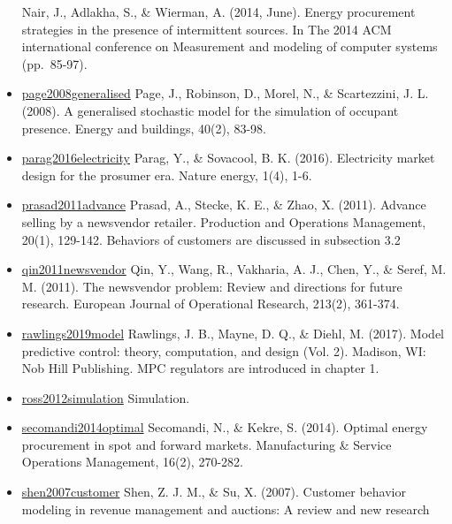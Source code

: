 \documentclass[letterpaper,8pt,twocolumn,twoside,]{pinp}
\begin{document}
\begin{itemize}
  Nair, J., Adlakha, S., \& Wierman, A. (2014, June). Energy procurement
  strategies in the presence of intermittent sources. In The 2014 ACM
  international conference on Measurement and modeling of computer
  systems (pp.~85-97).
\item
  \href{https://www.sciencedirect.com/science/article/pii/S037877880700031X}{page2008generalised}
  Page, J., Robinson, D., Morel, N., \& Scartezzini, J. L. (2008). A
  generalised stochastic model for the simulation of occupant presence.
  Energy and buildings, 40(2), 83-98.
\item
  \href{https://www.nature.com/articles/nenergy201632}{parag2016electricity}
  Parag, Y., \& Sovacool, B. K. (2016). Electricity market design for
  the prosumer era. Nature energy, 1(4), 1-6.
\item
  \href{https://onlinelibrary.wiley.com/doi/abs/10.1111/j.1937-5956.2010.01133.x?casa_token=lVRyRU67RhMAAAAA:8Dj0zKFhuT8i_4hkKs0PDvKRC3RUMLWaJk_poEYL7Z9oYcOJVB4-ZsEuT18KN15fuZcrCWLtaAeNayg}{prasad2011advance}
  Prasad, A., Stecke, K. E., \& Zhao, X. (2011). Advance selling by a
  newsvendor retailer. Production and Operations Management, 20(1),
  129-142. Behaviors of customers are discussed in subsection 3.2
\item
  \href{https://www.sciencedirect.com/science/article/pii/S0377221710008040}{qin2011newsvendor}
  Qin, Y., Wang, R., Vakharia, A. J., Chen, Y., \& Seref, M. M. (2011).
  The newsvendor problem: Review and directions for future research.
  European Journal of Operational Research, 213(2), 361-374.
\item
  \href{https://sites.engineering.ucsb.edu/~jbraw/mpc/}{rawlings2019model}
  Rawlings, J. B., Mayne, D. Q., \& Diehl, M. (2017). Model predictive
  control: theory, computation, and design (Vol. 2). Madison, WI: Nob
  Hill Publishing. MPC regulators are introduced in chapter 1.
\item
  \href{https://www.elsevier.com/books/simulation/ross/978-0-12-415825-2}{ross2012simulation}
  Simulation.
\item
  \href{https://pubsonline.informs.org/doi/10.1287/msom.2013.0473}{secomandi2014optimal}
  Secomandi, N., \& Kekre, S. (2014). Optimal energy procurement in spot
  and forward markets. Manufacturing \& Service Operations Management,
  16(2), 270-282.
\item
  \href{https://onlinelibrary.wiley.com/doi/abs/10.1111/j.1937-5956.2007.tb00291.x}{shen2007customer}
  Shen, Z. J. M., \& Su, X. (2007). Customer behavior modeling in
  revenue management and auctions: A review and new research

\end{itemize}
\end{document}
